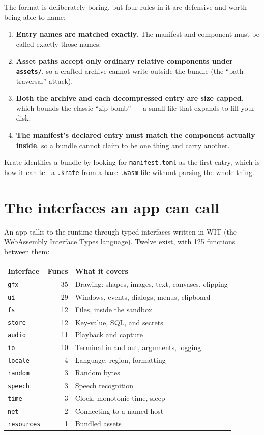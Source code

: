 \documentclass[11pt,a4paper]{report}
\begin{document}
The format is deliberately boring, but four rules in it are defensive and
worth being able to name:

\begin{enumerate}[leftmargin=*]
  \item \textbf{Entry names are matched exactly.} The manifest and component
    must be called exactly those names.
  \item \textbf{Asset paths accept only ordinary relative components under
    \texttt{assets/}}, so a crafted archive cannot write outside the bundle
    (the ``path traversal'' attack).
  \item \textbf{Both the archive and each decompressed entry are size
    capped}, which bounds the classic ``zip bomb'' --- a small file that
    expands to fill your disk.
  \item \textbf{The manifest's declared entry must match the component
    actually inside}, so a bundle cannot claim to be one thing and carry
    another.
\end{enumerate}

Krate identifies a bundle by looking for \texttt{manifest.toml} as the first
entry, which is how it can tell a \texttt{.krate} from a bare
\texttt{.wasm} file without parsing the whole thing.

\section{The interfaces an app can call}

An app talks to the runtime through typed interfaces written in WIT
(the WebAssembly Interface Types language). Twelve exist, with 125
functions between them:

\begin{center}
\begin{tabular}{lrp{7.2cm}}
\toprule
\textbf{Interface} & \textbf{Funcs} & \textbf{What it covers} \\
\midrule
\texttt{gfx} & 35 & Drawing: shapes, images, text, canvases, clipping \\
\texttt{ui} & 29 & Windows, events, dialogs, menus, clipboard \\
\texttt{fs} & 12 & Files, inside the sandbox \\
\texttt{store} & 12 & Key-value, SQL, and secrets \\
\texttt{audio} & 11 & Playback and capture \\
\texttt{io} & 10 & Terminal in and out, arguments, logging \\
\texttt{locale} & 4 & Language, region, formatting \\
\texttt{random} & 3 & Random bytes \\
\texttt{speech} & 3 & Speech recognition \\
\texttt{time} & 3 & Clock, monotonic time, sleep \\
\texttt{net} & 2 & Connecting to a named host \\
\texttt{resources} & 1 & Bundled assets \\
\bottomrule
\end{tabular}
\end{center}
\end{document}
